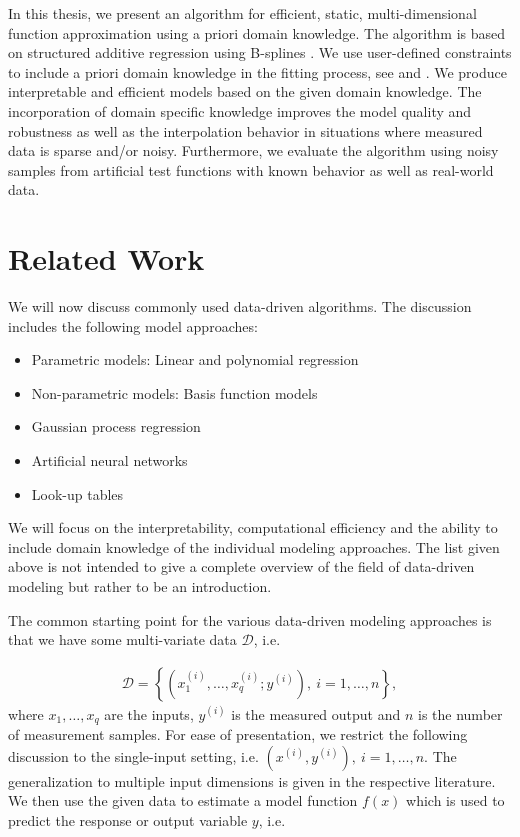 In this thesis, we present an algorithm for efficient, static, multi-dimensional function approximation using a priori domain knowledge. The algorithm is based on structured additive regression using B-splines \cite{fahrmeir2007regression}. We use user-defined constraints to include a priori domain knowledge in the fitting process, see \cite{hofner2011monotonicity} and \cite{bollaerts2006simple}. We produce interpretable and efficient models based on the given domain knowledge. The incorporation of domain specific knowledge improves the model quality and robustness as well as the interpolation behavior in situations where measured data is sparse and/or noisy. Furthermore, we evaluate the algorithm using noisy samples from artificial test functions with known behavior as well as real-world data.
\section{Related Work}

We will now discuss commonly used data-driven algorithms. The discussion includes the following model approaches:

\begin{itemize}
	\item Parametric models: Linear and polynomial regression
	\item Non-parametric models: Basis function models
	\item Gaussian process regression
	\item Artificial neural networks
	\item Look-up tables
\end{itemize}
%
We will focus on the interpretability, computational efficiency and the ability to include domain knowledge of the individual modeling approaches. The list given above is not intended to give a complete overview of the field of data-driven modeling but rather to be an introduction.

The common starting point for the various data-driven modeling approaches is that we have some multi-variate data $\mathcal{D}$, i.e.

\begin{align}
	\mathcal{D} = \left\{ (x_1^{(i)}, \dots, x_q^{(i)}; y^{(i)} ), \ i = 1, \dots, n\right\},
\end{align} 
%
where $x_1, \dots, x_q$ are the inputs, $y^{(i)}$ is the measured output and $n$ is the number of measurement samples. For ease of presentation, we restrict the following discussion to the single-input setting, i.e. $(x^{(i)}, y^{(i)}), \ i=1, \dots, n$. The generalization to multiple input dimensions is given in the respective literature. We then use the given data to estimate a model function $f(x)$  which is used to predict the response or output variable $y$, i.e.

